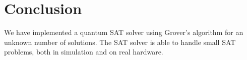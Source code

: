 \section{Conclusion}\label{sec:conclusion}

We have implemented a quantum SAT solver using Grover's algorithm for an unknown number of solutions.
The SAT solver is able to handle small SAT problems, both in simulation and on real hardware.
